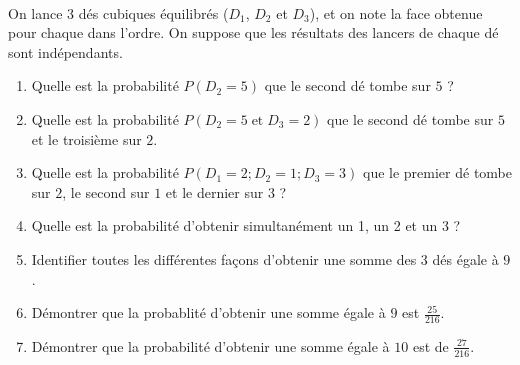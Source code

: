\documentclass[main.tex]{subfiles}
\begin{document}
\begin{exercise}
{ 
	} 
\end{exercise}

\begin{exercise}\label{chapter02:exercise:C10}\hfill \\
	On lance 3 dés cubiques équilibrés ($D_1$, $D_2$ et $D_3$), et on note la face obtenue pour chaque dans l'ordre. On suppose que les résultats des lancers de chaque dé sont indépendants.
	\begin{enumerate}[leftmargin=*, label=\arabic*)]
		\item Quelle est la probabilité $P(D_2=5)$  que le second dé tombe sur $5$ ?
		\item Quelle est la probabilité $P(D_2=5 \;\text{et}\;D_3=2)$ que le second dé tombe sur $5$ et le troisième sur $2$.
		\item Quelle est la probabilité $P(D_1=2; D_2=1; D_3=3)$ que le premier dé tombe sur $2$, le second sur $1$ et le dernier sur $3$ ?
		\item Quelle est la probabilité d'obtenir simultanément un 1, un 2 et un 3 ?
		\item Identifier toutes les différentes façons d'obtenir une somme des 3 dés égale à $9$.
		\item Démontrer que la probablité d'obtenir une somme égale à $9$ est $\frac{25}{216}$.
		\item Démontrer que la probabilité d'obtenir une somme égale à $10$ est de $\frac{27}{216}$.
	\end{enumerate} 
\end{exercise} 
\end{document}
